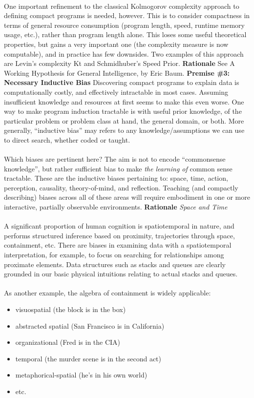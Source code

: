 \documentclass[twoside,11pt]{article}
\begin{document}
\\ 
 One important refinement to the classical Kolmogorov complexity approach to defining compact programs is needed, however. This is to consider compactness in terms of general resource consumption (program length, speed, runtime memory usage, etc.), rather than program length alone. This loses some useful theoretical properties, but gains a very important one (the complexity measure is now computable), and in practice has few downsides. Two examples of this approach are Levin's complexity Kt and Schmidhuber's Speed Prior. \textbf{Rationale}
 See A Working Hypothesis for General Intelligence, by Eric Baum. \textbf{Premise \#3: Necessary Inductive Bias}
 Discovering compact programs to explain data is computationally costly, and effectively intractable in most cases. Assuming insufficient knowledge and resources at first seems to make this even worse. One way to make program induction tractable is with useful prior knowledge, of the particular problem or problem class at hand, the general domain, or both. More generally, ``inductive bias'' may refers to any knowledge/assumptions we can use to direct search, whether coded or taught.\\ 
\\ 
 Which biases are pertinent here? The aim is not to encode ``commonsense knowledge'', but rather sufficient bias to make \emph{the learning of}
 common sense tractable. These are the inductive biases pertaining to: space, time, action, perception, causality, theory-of-mind, and reflection. Teaching (and compactly describing) biases across all of these areas will require embodiment in one or more interactive, partially observable environments. \textbf{Rationale}
\emph{Space and Time}
\\ 
\\ 
 A significant proportion of human cognition is spatiotemporal in nature, and performs structured inference based on proximity, trajectories through space, containment, etc. There are biases in examining data with a spatiotemporal interpretation, for example, to focus on searching for relationships among proximate elements. Data structures such as stacks and queues are clearly grounded in our basic physical intuitions relating to actual stacks and queues.\\ 
\\ 
 As another example, the algebra of containment is widely applicable: \begin{itemize}
\item visuospatial (the block is in the box)
\item abstracted spatial (San Francisco is in California)
\item organizational (Fred is in the CIA)
\item temporal (the murder scene is in the second act)
\item metaphorical-spatial (he's in his own world)
\item etc.

\end{itemize}
\end{document}
